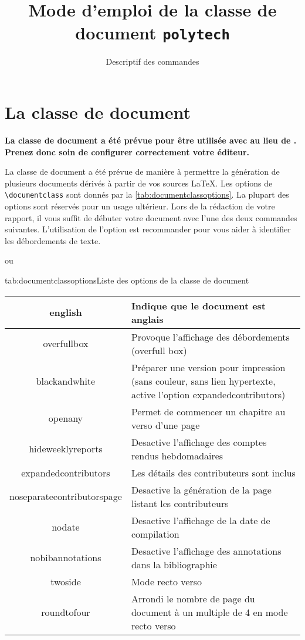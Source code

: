 \documentclass[overfullbox,hideweeklyreports,noseparatecontributorspage,nodate]{polytech}
\title{Mode d'emploi de la classe de document \texttt{polytech}}
\subtitle{Descriptif des commandes}
\begin{document}
\maketitle

\chapter{La classe de document}

\begin{center}
\textbf{La classe de document a été prévue pour être utilisée avec  au lieu de . Prenez donc soin de configurer correctement votre éditeur.}
\end{center}

La classe de document a été prévue de manière à permettre la génération de plusieurs documents dérivés à partir de vos sources LaTeX. Les options de \texttt{\textbackslash{}documentclass} sont donnés par la \autoref{tab:documentclassoptions}. La plupart des options sont réservés pour un usage ultérieur. Lors de la rédaction de votre rapport, il vous suffit de débuter votre document avec l'une des deux commandes suivantes. L'utilisation de l'option  est recommander pour vous aider à identifier les débordements de texte.
ou

\begin{Table}{tab:documentclassoptions}{Liste des options de la classe de document}
\begin{tabu}{|c|X[m]|}
\hline
english&Indique que le document est anglais\\\hline
overfullbox&Provoque l'affichage des débordements (overfull box)\\\hline
blackandwhite&Préparer une version pour impression (sans couleur, sans lien hypertexte, active l'option expandedcontributors)\\\hline
openany&Permet de commencer un chapitre au verso d'une page\\\hline
hideweeklyreports&Desactive l'affichage des comptes rendus hebdomadaires\\\hline
expandedcontributors&Les détails des contributeurs sont inclus\\\hline
noseparatecontributorspage&Desactive la génération de la page listant les contributeurs\\\hline
nodate&Desactive l'affichage de la date de compilation\\\hline
nobibannotations&Desactive l'affichage des annotations dans la bibliographie\\\hline
twoside&Mode recto verso\\\hline
roundtofour&Arrondi le nombre de page du document à un multiple de 4 en mode recto verso\\\hline
\end{tabu}
\end{Table}
\end{document}
